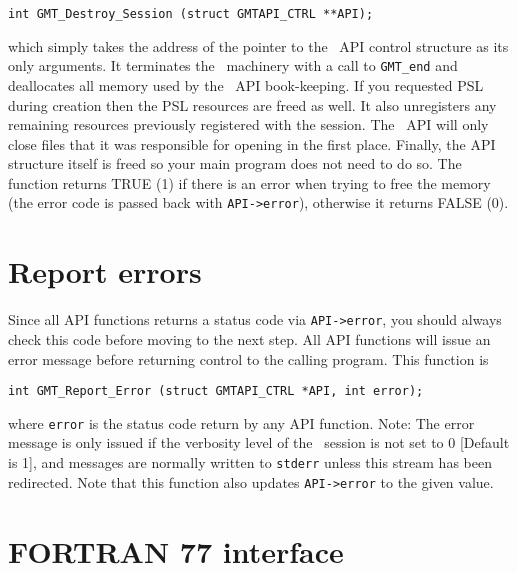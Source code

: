 \documentclass[11pt]{report}
\begin{document}
\begin{verbatim}
int GMT_Destroy_Session (struct GMTAPI_CTRL **API);
\end{verbatim}
which simply takes the address of the pointer to the \GMT\ API control structure as its only arguments.  It terminates the \GMT\ machinery
with a call to \texttt{GMT\_end} and deallocates all memory used by the \GMT\ API book-keeping. If you
requested PSL during creation then the PSL resources are freed as well.  It
also unregisters any remaining resources previously registered with the session.
The \GMT\ API will only close files that it was responsible for opening in the first place.
Finally, the API structure itself is freed so your main program does not need to do so.
The function returns TRUE (1) if there is an error when trying to free the memory
(the error code is passed back with \texttt{API->error}), otherwise it returns FALSE (0).

\section{Report errors}

Since all API functions returns a status code via \texttt{API->error}, you should always check this code before
moving to the next step.  All API functions will issue an error message before returning control
to the calling program.  This function is

\begin{verbatim}
int GMT_Report_Error (struct GMTAPI_CTRL *API, int error);
\end{verbatim}
where \texttt{error} is the status code return by any API function.  Note: The error message is
only issued if the verbosity level of the \GMT\ session is not set to 0 [Default is 1], and
messages are normally written to \texttt{stderr} unless this stream has been redirected.
Note that this function also updates \texttt{API->error} to the given value.
\section{FORTRAN 77 interface} 
\end{document}

